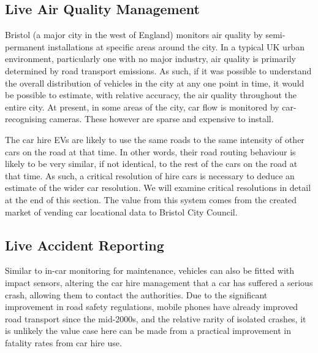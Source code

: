 \documentclass[conference]{IEEEtran}
\begin{document}
\subsection{Live Air Quality Management}

Bristol (a major city in the west of England) monitors air quality by
semi-permanent installations at specific areas around the city.  In a
typical UK urban environment, particularly one with no major industry,
air quality is primarily determined by road transport emissions.  As
such, if it was possible to understand the overall distribution of
vehicles in the city at any one point in time, it would be possible to
estimate, with relative accuracy, the air quality throughout the
entire city. At present, in some areas of the city, car flow is
monitored by car-recognising cameras. These however are sparse and
expensive to install.

The car hire EVs are likely to use the same roads to the same
intensity of other cars on the road at that time. In other words,
their road routing behaviour is likely to be very similar, if not
identical, to the rest of the cars on the road at that time. As such,
a critical resolution of hire cars is necessary to deduce an estimate
of the wider car resolution. We will examine critical resolutions in
detail at the end of this section.  The value from this system comes
from the created market of vending car locational data to Bristol City
Council.


\subsection{Live Accident Reporting}

Similar to in-car monitoring for maintenance, vehicles can also be
fitted with impact sensors, altering the car hire management that a
car has suffered a serious crash, allowing them to contact the
authorities.  Due to the significant improvement in road safety
regulations, mobile phones have already improved road transport since
the mid-2000s, and the relative rarity of isolated crashes, it is
unlikely the value case here can be made from a practical improvement
in fatality rates from car hire use.
\end{document}
